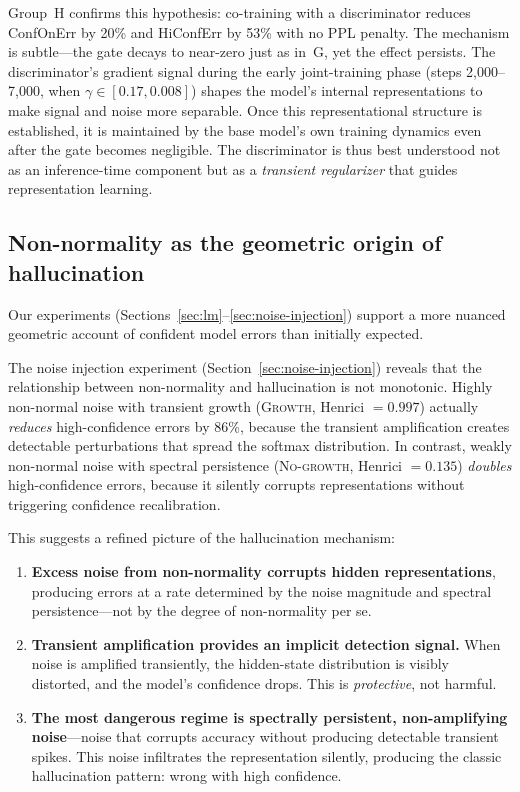 \documentclass[11pt,a4paper]{article}
\theoremstyle{definition}
\begin{document}
Group~H confirms this hypothesis: co-training with a discriminator
reduces ConfOnErr by 20\% and HiConfErr by 53\% with no PPL
penalty. The mechanism is subtle---the gate decays to near-zero
just as in~G, yet the effect persists. The discriminator's
gradient signal during the early joint-training phase (steps
2{,}000--7{,}000, when $\gamma \in [0.17, 0.008]$) shapes the
model's internal representations to make signal and noise more
separable. Once this representational structure is established,
it is maintained by the base model's own training dynamics even
after the gate becomes negligible. The discriminator is thus
best understood not as an inference-time component but as a
\emph{transient regularizer} that guides representation learning.

\subsection{Non-normality as the geometric origin of hallucination}

Our experiments (Sections~\ref{sec:lm}--\ref{sec:noise-injection})
support a more nuanced geometric account of confident model errors
than initially expected.

The noise injection experiment (Section~\ref{sec:noise-injection})
reveals that the relationship between non-normality and hallucination
is not monotonic. Highly non-normal noise with transient growth
(\textsc{Growth}, Henrici $= 0.997$) actually \emph{reduces}
high-confidence errors by 86\%, because the transient amplification
creates detectable perturbations that spread the softmax distribution.
In contrast, weakly non-normal noise with spectral persistence
(\textsc{No-growth}, Henrici $= 0.135$) \emph{doubles}
high-confidence errors, because it silently corrupts representations
without triggering confidence recalibration.

This suggests a refined picture of the hallucination mechanism:
\begin{enumerate}[nosep]
  \item \textbf{Excess noise from non-normality corrupts hidden
        representations}, producing errors at a rate determined by
        the noise magnitude and spectral persistence---not by the
        degree of non-normality per se.
  \item \textbf{Transient amplification provides an implicit
        detection signal.} When noise is amplified transiently, the
        hidden-state distribution is visibly distorted, and the
        model's confidence drops. This is \emph{protective}, not
        harmful.
  \item \textbf{The most dangerous regime is spectrally persistent,
        non-amplifying noise}---noise that corrupts accuracy without
        producing detectable transient spikes. This noise infiltrates
        the representation silently, producing the classic hallucination
        pattern: wrong with high confidence.
\end{enumerate}
\end{document}
